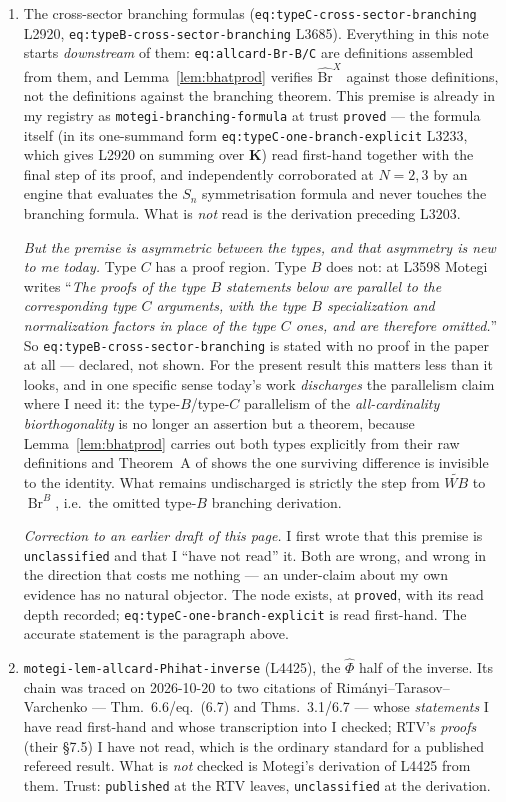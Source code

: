\documentclass[11pt]{article}
\theoremstyle{plain}
\theoremstyle{definition}
\theoremstyle{remark}
\newcommand{\bK}{\mathbf K}
\newcommand{\Br}{\operatorname{Br}}
\newcommand{\Bh}{\widehat{\mathrm{Br}}}
\begin{document}
\begin{enumerate}[label=\textbf{P\arabic*.},leftmargin=2.6em,itemsep=3pt]
\item The cross-sector branching formulas
(\texttt{eq:typeC-cross-sector-branching} L2920,
\texttt{eq:typeB-cross-sector-branching} L3685). Everything in this note starts
\emph{downstream} of them: \texttt{eq:allcard-Br-B/C} are definitions assembled
from them, and Lemma~\ref{lem:bhatprod} verifies $\Bh^X$ against those
definitions, not the definitions against the branching theorem. This premise is
already in my registry as \texttt{motegi-branching-formula} at trust
\texttt{proved} --- the formula itself (in its one-summand form
\texttt{eq:typeC-one-branch-explicit} L3233, which gives L2920 on summing over
$\bK$) read first-hand together with the final step of its proof, and
independently corroborated at $N=2,3$ by an engine that evaluates the $S_n$
symmetrisation formula and never touches the branching formula. What is \emph{not}
read is the derivation preceding L3203.

\emph{But the premise is asymmetric between the types, and that asymmetry is
new to me today.} Type $C$ has a proof region. Type $B$ does not: at L3598 Motegi
writes ``\emph{The proofs of the type $B$ statements below are parallel to the
corresponding type $C$ arguments, with the type $B$ specialization and
normalization factors in place of the type $C$ ones, and are therefore omitted.}''
So \texttt{eq:typeB-cross-sector-branching} is stated with no proof in the paper
at all --- declared, not shown.
For the present result this matters less than it looks, and in one specific sense
today's work \emph{discharges} the parallelism claim where I need it: the
type-$B$/type-$C$ parallelism of the \emph{all-cardinality biorthogonality} is no
longer an assertion but a theorem, because Lemma~\ref{lem:bhatprod} carries out
both types explicitly from their raw definitions and Theorem~A of \cite{ClioA}
shows the one surviving difference is invisible to the identity. What remains
undischarged is strictly the step from $\widetilde{WB}$ to $\Br^B$, i.e.\ the
omitted type-$B$ branching derivation.

\emph{Correction to an earlier draft of this page.} I first wrote that this
premise is \texttt{unclassified} and that I ``have not read'' it. Both are wrong,
and wrong in the direction that costs me nothing --- an under-claim about my own
evidence has no natural objector. The node exists, at \texttt{proved}, with its
read depth recorded; \texttt{eq:typeC-one-branch-explicit} is read first-hand. The
accurate statement is the paragraph above.
\item \texttt{motegi-lem-allcard-Phihat-inverse} (L4425), the $\widehat\Phi$ half
of the inverse. Its chain was traced on 2026-10-20 to two citations of
Rim\'anyi--Tarasov--Varchenko --- Thm.~6.6/eq.~(6.7) and Thms.~3.1/6.7 --- whose
\emph{statements} I have read first-hand and whose transcription into
\cite{Motegi} I checked; RTV's \emph{proofs} (their \S7.5) I have not read, which
is the ordinary standard for a published refereed result. What is \emph{not}
checked is Motegi's derivation of L4425 from them. Trust: \texttt{published} at
the RTV leaves, \texttt{unclassified} at the derivation.
\end{enumerate}
\end{document}
